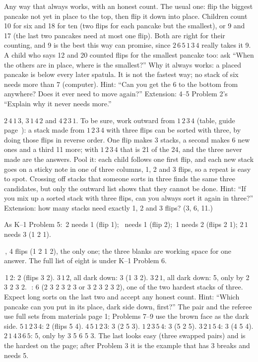 Any way that always works, with an honest count. The usual one: flip the biggest pancake not yet in place to the top, then flip it down into place. Children count 10 for six and 18 for ten (two flips for each pancake but the smallest), or 9 and 17 (the last two pancakes need at most one flip). Both are right for their counting, and 9 is the best this way can promise, since $2\,6\,5\,1\,3\,4$ really takes it 9. A child who says 12 and 20 counted flips for the smallest pancake too: ask ``When the others are in place, where is the smallest?'' Why it always works: a placed pancake is below every later spatula. It is not the fastest way; no stack of six needs more than 7 (computer). Hint: ``Can you get the 6 to the bottom from anywhere? Does it ever need to move again?'' Extension: 4--5 Problem 2's ``Explain why it never needs more.''

$2\,4\,1\,3$, $3\,1\,4\,2$ and $4\,2\,3\,1$. To be sure, work outward from $1\,2\,3\,4$ (table, guide page~\pageref{tab:four}): a stack made from $1\,2\,3\,4$ with three flips can be sorted with three, by doing those flips in reverse order. One flip makes 3 stacks, a second makes 6 new ones and a third 11 more; with $1\,2\,3\,4$ that is 21 of the 24, and the three never made are the answers. Pool it: each child follows one first flip, and each new stack goes on a sticky note in one of three columns, 1, 2 and 3 flips, so a repeat is easy to spot. Crossing off stacks that someone sorts in three finds the same three candidates, but only the outward list shows that they cannot be done. Hint: ``If you mix up a sorted stack with three flips, can you always sort it again in three?'' Extension: how many stacks need exactly 1, 2 and 3 flips? (3, 6, 11.)

As K--1 Problem 5: \,2 needs 1 (flip 1); \, needs 1 (flip 2); \,1 needs 2 (flips 2 1); $2\,1$ needs 3 (1 2 1).

\,, 4 flips (1 2 1 2), the only one; the three blanks are working space for one answer. The full list of eight is under K--1 Problem 6.

\,1\,2: 2 (flips 3 2). $3\,1\,2$, all dark down: 3 (1 3 2). $3\,2\,1$, all dark down: 5, only by 2 3 2 3 2. \,\,: 6 (2 3 2 3 2 3 or 3 2 3 2 3 2), one of the two hardest stacks of three. Expect long sorts on the last two and accept any honest count. Hint: ``Which pancake can you put in its place, dark side down, first?''
\newpage
{}
The pair and the referee use full sets from materials page 1; Problems 7--9 use the brown face as the dark side.
$5\,1\,2\,3\,4$: 2 (flips 5 4). $4\,5\,1\,2\,3$: 3 (2 5 3). $1\,2\,3\,5\,4$: 3 (5 2 5). $3\,2\,1\,5\,4$: 3 (4 5 4). $2\,1\,4\,3\,6\,5$: 5, only by 3 5 6 5 3. The last looks easy (three swapped pairs) and is the hardest on the page; after Problem 3 it is the example that has 3 breaks and needs 5.


